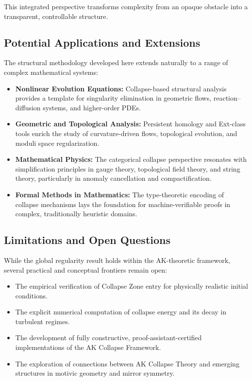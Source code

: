 \documentclass[11pt]{article}
\begin{document}
This integrated perspective transforms complexity from an opaque obstacle into a transparent, controllable structure.

\subsection{Potential Applications and Extensions}

The structural methodology developed here extends naturally to a range of complex mathematical systems:

\begin{itemize}
  \item \textbf{Nonlinear Evolution Equations:} Collapse-based structural analysis provides a template for singularity elimination in geometric flows, reaction--diffusion systems, and higher-order PDEs.
  \item \textbf{Geometric and Topological Analysis:} Persistent homology and Ext-class tools enrich the study of curvature-driven flows, topological evolution, and moduli space regularization.
  \item \textbf{Mathematical Physics:} The categorical collapse perspective resonates with simplification principles in gauge theory, topological field theory, and string theory, particularly in anomaly cancellation and compactification.
  \item \textbf{Formal Methods in Mathematics:} The type-theoretic encoding of collapse mechanisms lays the foundation for machine-verifiable proofs in complex, traditionally heuristic domains.
\end{itemize}

\subsection{Limitations and Open Questions}

While the global regularity result holds within the AK-theoretic framework, several practical and conceptual frontiers remain open:

\begin{itemize}
  \item The empirical verification of Collapse Zone entry for physically realistic initial conditions.
  \item The explicit numerical computation of collapse energy and its decay in turbulent regimes.
  \item The development of fully constructive, proof-assistant-certified implementations of the AK Collapse Framework.
  \item The exploration of connections between AK Collapse Theory and emerging structures in motivic geometry and mirror symmetry.
\end{itemize}
\end{document}
